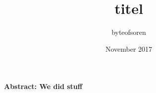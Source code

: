 \documentclass[conference]{IEEEtran}
\title{titel}
\author{
byteofsoren
}
\date{November 2017}
\begin{document}
\maketitle
\textbf{Abstract:
We did stuff
} \\
%






%
\end{document}
